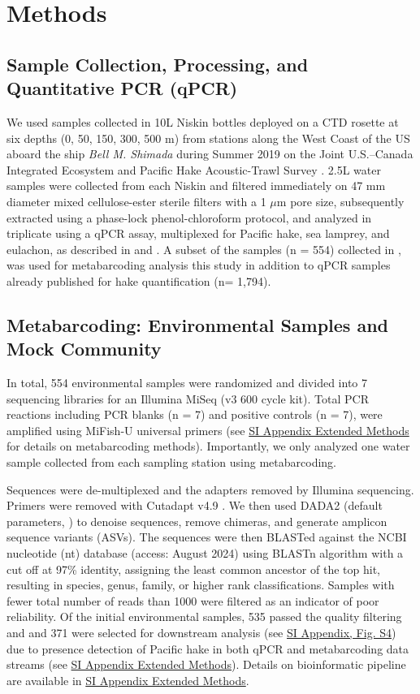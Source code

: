 \documentclass{article}
\begin{document}
\section*{Methods}

\subsection*{Sample Collection, Processing, and Quantitative PCR (qPCR)}
We used samples collected in 10L Niskin bottles deployed on a CTD rosette at six depths (0, 50, 150, 300, 500 m) from stations along the West Coast of the US aboard the ship \textit{Bell M. Shimada} during Summer 2019 on the Joint U.S.–Canada Integrated Ecosystem and Pacific Hake Acoustic-Trawl Survey \cite{deblois2020}. 2.5L water samples were collected from each Niskin and filtered immediately on 47 mm diameter mixed cellulose-ester sterile filters with a 1 $\mu$m pore size, subsequently extracted using a phase-lock phenol-chloroform protocol, and analyzed in triplicate using a qPCR assay, multiplexed for Pacific hake, sea lamprey, and eulachon, as described in \cite{ramon-laca2021} and \cite{shelton2022}. A subset of the samples (n = 554) collected in \cite{shelton2022}, was used for metabarcoding analysis this study in addition to qPCR samples already published for hake quantification \cite{shelton2022} (n= 1,794). 

\subsection*{Metabarcoding: Environmental Samples and Mock Community}
In total, 554 environmental samples were randomized and divided into 7 sequencing libraries for an Illumina MiSeq (v3 600 cycle kit). Total PCR reactions including PCR blanks (n = 7) and positive controls (n = 7), were amplified using MiFish-U universal primers \cite{miya2015} (see \href{SI_Appendix.pdf}{SI Appendix Extended Methods} for details on metabarcoding methods). Importantly, we only analyzed one water sample collected from each sampling station using metabarcoding.

Sequences were de-multiplexed and the adapters removed by Illumina sequencing. Primers were removed with Cutadapt v4.9 \cite{martin2011}. We then used DADA2 (default parameters, \cite{callahan2016}) to denoise sequences, remove chimeras, and generate amplicon sequence variants (ASVs). The sequences were then BLASTed against the NCBI nucleotide (nt) database (access: August 2024) using BLASTn algorithm with a cut off at 97\% identity, assigning the least common ancestor of the top hit, resulting in species, genus, family, or higher rank classifications. Samples with fewer total number of reads than 1000 were filtered as an indicator of poor reliability. Of the initial environmental samples, 535 passed the quality filtering and and 371 were selected for downstream analysis (see \href{SI_Appendix.pdf}{SI Appendix, Fig. S4}) due to presence detection of Pacific hake in both qPCR and metabarcoding data streams (see \href{SI_Appendix.pdf}{SI Appendix Extended Methods}). Details on bioinformatic pipeline are available in \href{SI_Appendix.pdf}{SI Appendix Extended Methods}.
\end{document}
